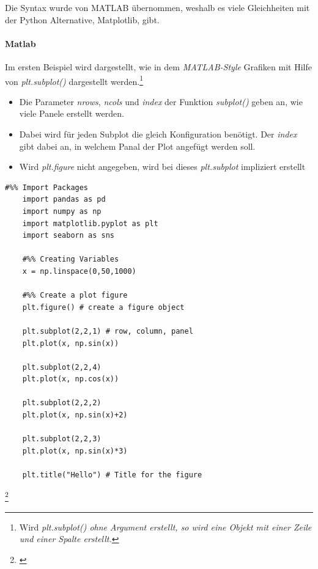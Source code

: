 Die Syntax wurde von MATLAB übernommen, weshalb es viele Gleichheiten mit der Python Alternative, Matplotlib, gibt.\\

\paragraph{Matlab}
Im ersten Beispiel wird dargestellt, wie in dem \textit{MATLAB-Style} Grafiken mit Hilfe von \textit{plt.subplot()} dargestellt werden.\footnote{Wird \textit{plt.subplot() ohne Argument erstellt, so wird eine Objekt mit einer Zeile und einer Spalte erstellt.}}
\begin{itemize}
	\item Die Parameter \textit{nrows}, \textit{ncols} und \textit{index} der Funktion \textit{subplot()} geben an, wie viele Panele erstellt werden.
	\item Dabei wird für jeden Subplot die gleich Konfiguration benötigt. Der \textit{index} gibt dabei an, in welchem Panal der Plot angefügt werden soll.
	\item Wird \textit{plt.figure} nicht angegeben, wird bei dieses \textit{plt.subplot} impliziert erstellt
\end{itemize}

\begin{lstlisting}[style=Python]
	#%% Import Packages
	import pandas as pd
	import numpy as np
	import matplotlib.pyplot as plt 
	import seaborn as sns 
	
	#%% Creating Variables
	x = np.linspace(0,50,1000)
	
	#%% Create a plot figure
	plt.figure() # create a figure object
	
	plt.subplot(2,2,1) # row, column, panel
	plt.plot(x, np.sin(x))
	
	plt.subplot(2,2,4)
	plt.plot(x, np.cos(x))
	
	plt.subplot(2,2,2)
	plt.plot(x, np.sin(x)+2)
	
	plt.subplot(2,2,3)
	plt.plot(x, np.sin(x)*3)
	
	plt.title("Hello") # Title for the figure
\end{lstlisting} \footnote{\cite[240]{Book.Python-DSci}}





